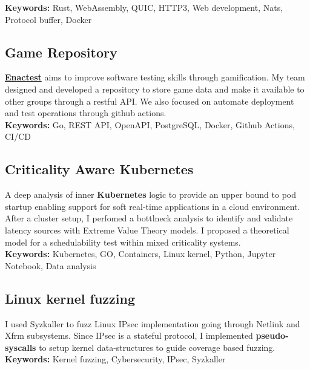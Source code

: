 \documentclass[11pt,a4paper]{article}
\begin{document}
  \textbf{Keywords:} Rust, WebAssembly, QUIC, HTTP3, Web development, Nats, Protocol buffer, Docker 
  
  \subsection{Game Repository \href{https://github.com/alarmfox/game-repository}{\faGithub} \href{https://game-repository.capass.org}{\faLaptopCode}}
  \textbf{\href{https://enactest-project.eu/}{Enactest}} aims to improve software testing skills through gamification. My team designed and developed a repository to store game data and make it available to other groups through a restful API. We also focused on automate deployment and test operations through github actions. \\

  \textbf{Keywords:} Go, REST API, OpenAPI, PostgreSQL, Docker, Github Actions, CI/CD 

  \subsection{Criticality Aware Kubernetes \href{https://github.com/alarmfox/criticality-aware-kubernetes}{\faGithub}}
  A deep analysis of inner \textbf{Kubernetes} logic to provide an upper bound to pod startup enabling support for 
  soft real-time applications in a cloud environment. After a cluster setup, I perfomed a bottlneck analysis to identify and validate latency sources with Extreme Value Theory models. I proposed a theoretical model for a schedulability test within mixed criticality systems. \\

  \textbf{Keywords:} Kubernetes, GO, Containers, Linux kernel, Python, Jupyter Notebook, Data analysis

  \subsection{Linux kernel fuzzing \href{https://github.com/alarmfox/progetto-software-security}{\faGithub}}
  I used Syzkaller to fuzz Linux IPsec implementation going through Netlink and Xfrm subsystems. Since IPsec is a 
  stateful protocol, I implemented \textbf{pseudo-syscalls} to setup kernel data-structures to guide coverage based 
  fuzzing. \\

  \textbf{Keywords:} Kernel fuzzing, Cybersecurity, IPsec, Syzkaller 
\end{document}
